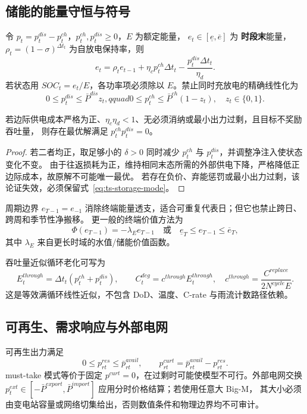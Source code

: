 \subsection{储能的能量守恒与符号}
令 $p_t=p_t^{dis}-p_t^{ch}$，$p_t^{ch},p_t^{dis}\ge0$，$E$ 为额定能量，
$e_t\in[\underline e,\overline e]$ 为
\textbf{时段末}能量，$\rho_t=(1-\sigma)^{\Delta t_t}$ 为自放电保持率，则
\begin{equation}
e_t=\rho_te_{t-1}+\eta_c p_t^{ch}\Delta t_t
-\frac{p_t^{dis}\Delta t_t}{\eta_d}.\label{eq:ts-storage-energy}
\end{equation}
若状态用 $SOC_t=e_t/E$，各功率项必须除以 $E$。禁止同时充放电的精确线性化为
\begin{equation}
0\le p_t^{dis}\le\bar P^{dis}z_t,qquad
0\le p_t^{ch}\le\bar P^{ch}(1-z_t),\quad z_t\in\{0,1\}.\label{eq:ts-storage-mode}
\end{equation}

\begin{lemma}[有损储能的同时充放电消除]\label{lem:ts-nosim}
若边际供电成本严格为正、$\eta_c\eta_d<1$、无必须消纳或最小出力过剩，且目标不奖励吞吐量，
则存在最优解满足 $p_t^{ch}p_t^{dis}=0$。
\end{lemma}
\begin{proof}
若二者均正，取足够小的 $\delta>0$ 同时减少 $p_t^{ch}$ 与 $p_t^{dis}$，并调整净注入使状态变化不变。
由于往返损耗为正，维持相同末态所需的外部供电下降，严格降低正边际成本，故原解不可能唯一最优。
若存在负价、弃能惩罚或最小出力过剩，该论证失效，必须保留式~\eqref{eq:ts-storage-mode}。
\end{proof}

周期边界 $e_{T-1}=e_{-1}$ 消除终端能量透支，适合可重复代表日；但它也禁止跨日、跨周和季节性净搬移。
更一般的终端价值方法为
\begin{equation}
\Phi(e_{T-1})=-\lambda_Ee_{T-1}\quad\text{或}\quad
\underline e_T\le e_{T-1}\le\overline e_T,\label{eq:ts-terminal}
\end{equation}
其中 $\lambda_E$ 来自更长时域的水值/储能价值函数。

吞吐量近似循环老化可写为
\begin{equation}
E_t^{through}=\Delta t_t(p_t^{ch}+p_t^{dis}),\qquad
C_t^{deg}=c^{through}E_t^{through},\quad
c^{through}=\frac{C^{replace}}{2N^{cycle}E}.\label{eq:ts-degradation}
\end{equation}
这是等效满循环线性近似，不包含 DoD、温度、C-rate 与雨流计数路径依赖。

\subsection{可再生、需求响应与外部电网}
可再生出力满足
\begin{equation}
0\le p_{rt}^{res}\le\bar p_{rt}^{avail},\qquad
p_{rt}^{curt}=\bar p_{rt}^{avail}-p_{rt}^{res}.\label{eq:ts-renewable}
\end{equation}
must-take 模式等价于固定 $p^{curt}=0$，在过剩时可能使模型不可行。外部电网交换
$p_t^{ext}\in[-\bar P^{export},\bar P^{import}]$ 应用分时价格结算；若使用任意大 Big-M，
其大小必须由变电站容量或网络切集给出，否则数值条件和物理边界均不可审计。

